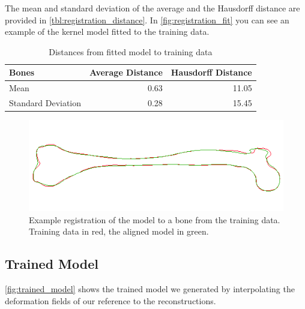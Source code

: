 The mean and standard deviation of the average and the Hausdorff distance are provided in \autoref{tbl:registration_distance}.
In \autoref{fig:registration_fit} you can see an example of the kernel model fitted to the training data.

\begin{table}
  \centering
  \caption{Distances from fitted model to training data}
  \label{tbl:registration_distance}
  \begin{tabular}{lrr}
    \toprule
      \textbf{Bones} &
      Average Distance &
      Hausdorff Distance \\
    \midrule
      Mean& 0.63 & 11.05 \\
      Standard Deviation& 0.28 & 15.45 \\
    \bottomrule
  \end{tabular}
\end{table}

\begin{figure}
	\centering
  \includegraphics[scale=0.7]{./Figures/registration_fit}
  \caption{Example registration of the model to a bone from the training data. Training data in red, the aligned model in green.}
  \label{fig:registration_fit}
\end{figure}


\subsection{Trained Model}
\label{subsec:trainedmodel}
\autoref{fig:trained_model} shows the trained model we generated by interpolating the deformation fields of our reference to the reconstructions.

